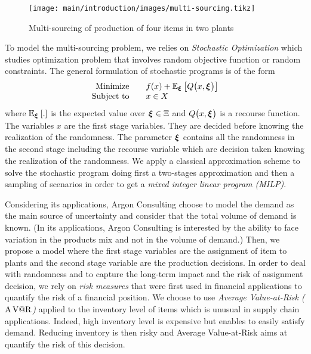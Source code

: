 \begin{figure}[!ht]
  \centering
  \texttt{[image: main/introduction/images/multi-sourcing.tikz]}
  \caption{Multi-sourcing of production of four items in two plants}
  \label{fig:intro:en:multi-sourcing}
\end{figure}


\medskip


To model the multi-sourcing problem, we relies on \emph{Stochastic Optimization} which studies optimization problem that involves random objective function or random constraints.
The general formulation of stochastic programs is of the form
\begin{equation}
\begin{array}{rl}
  \mbox{Minimize} \quad & f(x) + \espe_{\va\xi}\sqbracket{Q\bracket{x,\va\xi}} \\
  \mbox{Subject to} \quad & x \in X
\end{array}
\end{equation}
where $\espe_{\va\xi}\sqbracket{.}$ is the expected value over $\va\xi\in\Xi$ and $Q\bracket{x,\va\xi}$ is a recourse function.
The variables $x$ are the first stage variables.
They are decided before knowing the realization of the randomness.
The parameter $\va\xi$ contains all the randomness in the second stage including the recourse variable which are decision taken knowing the realization of the randomness.
We apply a classical approximation scheme to solve the stochastic program doing first a two-stages approximation and then a sampling of scenarios in order to get a \emph{mixed integer linear program (MILP)}.


\medskip


Considering its applications, Argon Consulting choose to model the demand as the main source of uncertainty and consider that the total volume of demand is known.
(In its applications, Argon Consulting is interested by the ability to face variation in the products mix and not in the volume of demand.)
Then, we propose a model where the first stage variables are the assignment of item to plants and the second stage variable are the production decisions.
In order to deal with randomness and to capture the long-term impact and the risk of assignment decision, we rely on \emph{risk measures} that were first used in financial applications to quantify the risk of a financial position.
We choose to use \emph{Average Value-at-Risk ($\operatorname{A\operatorname{V@R}}$)} applied to the inventory level of items which is unusual in supply chain applications.
Indeed, high inventory level is expensive but enables to easily satisfy demand.
Reducing inventory is then risky and Average Value-at-Risk aims at quantify the risk of this decision.


